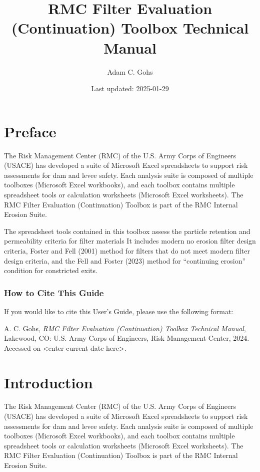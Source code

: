 \documentclass[
]{book}
\title{RMC Filter Evaluation (Continuation) Toolbox Technical Manual}
\author{Adam C. Gohs}
\date{Last updated: 2025-01-29}
\newenvironment{citation-note}
    {\begin{quote}\itshape}
    {\end{quote}}
\begin{document}
\maketitle

{
\setcounter{tocdepth}{1}
\tableofcontents
}
\chapter*{Preface}\label{preface}

The Risk Management Center (RMC) of the U.S. Army Corps of Engineers (USACE) has developed a suite of Microsoft Excel spreadsheets to support risk assessments for dam and levee safety. Each analysis suite is composed of multiple toolboxes (Microsoft Excel workbooks), and each toolbox contains multiple spreadsheet tools or calculation worksheets (Microsoft Excel worksheets). The RMC Filter Evaluation (Continuation) Toolbox is part of the RMC Internal Erosion Suite.

The spreadsheet tools contained in this toolbox assess the particle retention and permeability criteria for filter materials It includes modern no erosion filter design criteria, Foster and Fell (2001) method for filters that do not meet modern filter design criteria, and the Fell and Foster (2023) method for ``continuing erosion'' condition for constricted exits.

\subsection*{How to Cite This Guide}\label{how-to-cite-this-guide}

If you would like to cite this User's Guide, please use the following format:

\begin{citation-note}
A. C. Gohs, \emph{RMC Filter Evaluation (Continuation) Toolbox Technical
Manual}, Lakewood, CO: U.S. Army Corps of Engineers, Risk Management
Center, 2024. Accessed on {\textless enter current date
here\textgreater{}}.
\end{citation-note}

\chapter{Introduction}\label{introduction}

The Risk Management Center (RMC) of the U.S. Army Corps of Engineers (USACE) has developed a suite of Microsoft Excel spreadsheets to support risk assessments for dam and levee safety. Each analysis suite is composed of multiple toolboxes (Microsoft Excel workbooks), and each toolbox contains multiple spreadsheet tools or calculation worksheets (Microsoft Excel worksheets). The RMC Filter Evaluation (Continuation) Toolbox is part of the RMC Internal Erosion Suite.
\end{document}
